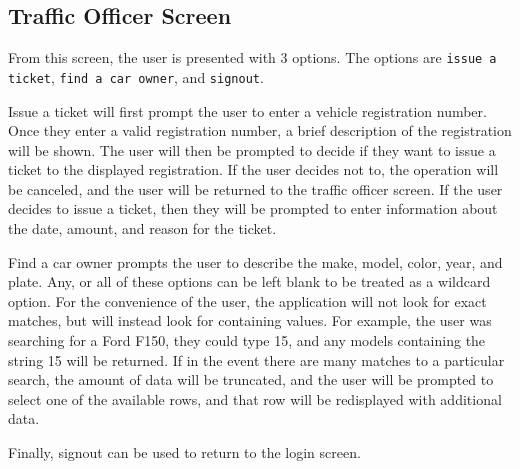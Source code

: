 \subsection{Traffic Officer Screen}

From this screen, the user is presented with 3 options. The options are
\verb|issue a ticket|, \verb|find a car owner|, and \verb|signout|.

Issue a ticket will first prompt the user to enter a vehicle registration
number. Once they enter a valid registration number, a brief description of the
registration will be shown. The user will then be prompted to decide if they
want to issue a ticket to the displayed registration. If the user decides not
to, the operation will be canceled, and the user will be returned to the
traffic officer screen. If the user decides to issue a ticket, then they will
be prompted to enter information about the date, amount, and reason for the
ticket.

Find a car owner prompts the user to describe the make, model, color, year, and
plate. Any, or all of these options can be left blank to be treated as a
wildcard option. For the convenience of the user, the application will not look
for exact matches, but will instead look for containing values. For example, the
user was searching for a Ford F150, they could type 15, and any models
containing the string 15 will be returned. If in the event there are many
matches to a particular search, the amount of data will be truncated, and the
user will be prompted to select one of the available rows, and that row will be
redisplayed with additional data.

Finally, signout can be used to return to the login screen.

